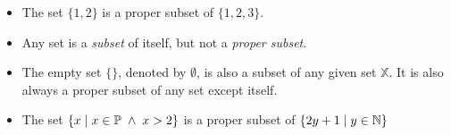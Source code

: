 \begin{example}
\begin{itemize}
	\item The set $\{1, 2 \}$ is a proper subset of $\{ 1, 2, 3 \}$.
	\item Any set is a {\em subset} of itself, but not a {\em proper subset}.
	\item The empty set $\{ \} $, denoted by $\emptyset $, is also a subset of any given set $\mathbb{X}$. It is also always a proper subset of any set except itself.
	\item The set $\{x\; | \; x\in\mathbb{P}\; \wedge\; x > 2 \}$ is a proper subset of 
	        $ \{ 2y+1 \; | \; y\in\mathbb{N} \}$
\end{itemize}
\end{example}
